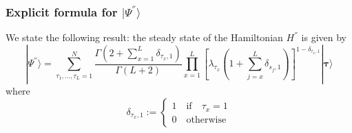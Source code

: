 \documentclass[10pt]{article}
\numberwithin{equation}{section}
\numberwithin{equation}{subsection}
\begin{document}

\subsubsection{Explicit formula for $|\Psi^{''}\rangle$}\label{subsectionSSHsec}
We state the following result: the steady state of the Hamiltonian $H^{''}$ is given by 
\begin{equation}\label{ResulsBasis}
	|\Psi^{''} \rangle=\sum_{\tau_{1},\ldots,\tau_{L}=1}^{N}\frac{\Gamma\left(2+\sum_{x=1}^{L}\delta_{\tau_{x},1}\right)}{\Gamma\left(L+2\right)}\prod_{x=1}^{L}\left[\lambda_{\tau_{x}}\left(1+\sum_{j=x}^{L}\delta_{s_{j},1}\right)\right]^{1-\delta_{\tau_{x},1}}|\mathbf{\bm{\tau}}\rangle
\end{equation}
where 
\begin{equation}
    \delta_{\tau_{x},1}:=\begin{cases}
        1\quad \text{if}\quad \tau_{x}=1\\
        0\quad \text{otherwise}
    \end{cases}
\end{equation}
\end{document}
